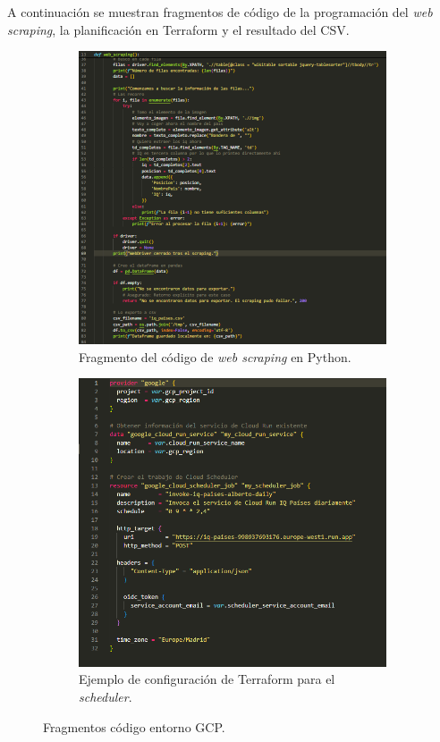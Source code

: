 A continuación se muestran fragmentos de código de la programación del \textit{web scraping}, la planificación en Terraform y el resultado del CSV. 
\begin{figure}[H]
\centering
\begin{subfigure}[b]{0.48\textwidth}
\centering
\includegraphics[width=\textwidth]{figuras/captura_webscraping.png}
\caption[Fragmento del código de web scrapping]{Fragmento del código de \textit{web scraping} en Python.}
\label{webscraping}
\end{subfigure}
\hfill
\begin{subfigure}[b]{0.49\textwidth}
\centering
\includegraphics[width=\textwidth]{figuras/captura_terraform.png}
\caption[Fragmento del código del scheduler]{Ejemplo de configuración de Terraform para el \textit{scheduler}.}
\label{terraform}
\end{subfigure}
\caption{Fragmentos código entorno GCP.}
\label{TerraformWebScraping}
\end{figure}

